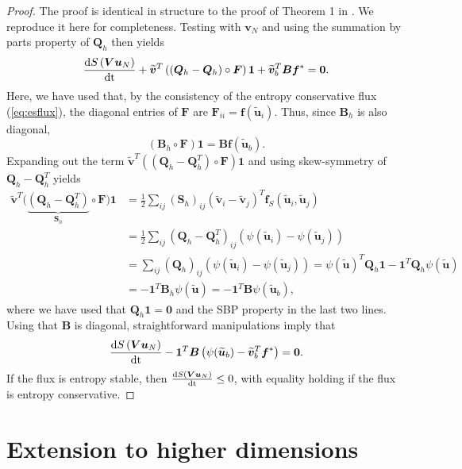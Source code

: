 \documentclass[review]{siamart171218}
\theoremstyle{assumption}
\renewcommand{\tilde}{\widetilde}
\newcommand{\td}[2]{\frac{{\rm d}#1}{{\rm d}{\rm #2}}}
\newcommand{\LRp}[1]{\left( #1 \right)}
\newcommand{\note}[1]{{\color{blue}{#1}}}
\begin{document}
\begin{proof}
The proof is identical in structure to the proof of Theorem 1 in \cite{chan2017discretely}.  We reproduce it here for completeness.
Testing with $\bm{v}_N$ and using the summation by parts property of $\bm{Q}_h$ then yields 
\begin{align*}
\td{S\LRp{\bm{V}\bm{u}_N}}{t}  + \tilde{\bm{v}}^T\LRp{\LRp{\bm{Q}_h-\bm{Q}_h} \circ \bm{F}}\bm{1} + \tilde{\bm{v}}_b^T\bm{B}\bm{f}^*  = \bm{0}.
\end{align*}
Here, we have used that, by the consistency of the entropy conservative flux (\ref{eq:esflux}), the diagonal entries of $\bm{F}$ are $\bm{F}_{ii} = \bm{f}\LRp{\tilde{\bm{u}}_i}$.  Thus, since $\bm{B}_h$ is also diagonal,
\[
\LRp{\bm{B}_h\circ\bm{F}}\bm{1} = \bm{B} \bm{f}(\tilde{\bm{u}}_b).
\]
Expanding out the term $\tilde{\bm{v}}^T\LRp{\LRp{\bm{Q}_h-\bm{Q}_h^T} \circ \bm{F}}\bm{1}$ and using skew-symmetry of $\bm{Q}_h-\bm{Q}_h^T$ yields
\begin{align*}
\tilde{\bm{v}}^T\big(\underbrace{\LRp{\bm{Q}_h-\bm{Q}_h^T}}_{\bm{S}_h} \circ \bm{F}\big)\bm{1} &= 
\frac{1}{2}\sum_{ij} \LRp{\bm{S}_h}_{ij} \LRp{\tilde{\bm{v}}_i-\tilde{\bm{v}}_j}^T\bm{f}_S\LRp{\tilde{\bm{u}}_i,\tilde{\bm{u}}_j}\\
&= \frac{1}{2}\sum_{ij} \LRp{\bm{Q}_h-\bm{Q}_h^T}_{ij} \LRp{\psi(\tilde{\bm{u}}_i)-\psi(\tilde{\bm{u}}_j)}\\
&= \sum_{ij} \LRp{\bm{Q}_h}_{ij} \LRp{\psi(\tilde{\bm{u}}_i)-\psi(\tilde{\bm{u}}_j)} = {\psi(\tilde{\bm{u}})^T\bm{Q}_h\bm{1} - \bm{1}^T\bm{Q}_h\psi(\tilde{\bm{u}})}\\
& = -\bm{1}^T\bm{B}_h\psi(\tilde{\bm{u}}) = -\bm{1}^T\bm{B}\psi(\tilde{\bm{u}}_b),
\end{align*}
where we have used that $\bm{Q}_h\bm{1} = \bm{0}$ and the SBP property in the last two lines.  Using that $\bm{B}$ is diagonal, straightforward manipulations imply that
\[
\td{S\LRp{\bm{V}\bm{u}_N}}{t}  - \bm{1}^T\bm{B}\LRp{\psi(\tilde{\bm{u}}_b)-\tilde{\bm{v}}_b^T\bm{f}^*}  = \bm{0}.
\]
If the flux is entropy stable, then $\td{S\LRp{\bm{V}\bm{u}_N}}{t} \leq 0$, with equality holding if the flux is entropy conservative.
\end{proof}


\section{Extension to higher dimensions}
\label{sec:7}
\end{document}

